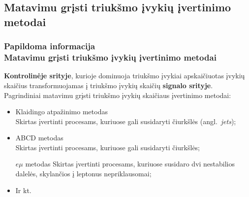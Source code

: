 \documentclass[xcolor=dvipsnames]{beamer}
\newcommand{\emu}{\mathit{e}\mu}
\begin{document}
\begin{frame}
	\subsection{Matavimu grįsti triukšmo įvykių įvertinimo metodai}
	\frametitle{Papildoma informacija\\ \small Matavimu grįsti triukšmo įvykių įvertinimo metodai}
	\textbf{Kontrolinėje srityje}, kurioje dominuoja triukšmo įvykiai apskaičiuotas įvykių skaičius transformuojamas į triukšmo
	įvykių skaičių \textbf{signalo srityje}.\\
	\vspace{0.3cm}
	Pagrindiniai matavimu grįsti triukšmo įvykių skaičiaus įvertinimo metodai:
	\begin{itemize}
		\item Klaidingo atpažinimo metodas\\
			Skirtas įvertinti procesams, kuriuose gali susidaryti čiurkšlės (angl.\ \textit{jets});
		\item ABCD metodas\\
			Skirtas įvertinti procesams, kuriuose gali susidaryti čiurkšlės;
		\begin{block}{$\emu$ metodas}
			Skirtas įvertinti procesams, kuriuose susidaro dvi nestabilios dalelės, skylančios į leptonus nepriklausomai;
		\end{block}
		\item Ir kt.
	\end{itemize}
\end{frame}
\end{document}
